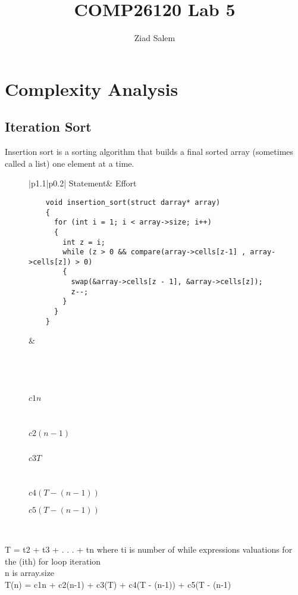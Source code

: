 \documentclass{article}
\title{COMP26120 Lab 5}
\author{Ziad Salem}
\begin{document}
\maketitle


\section{Complexity Analysis}
\label{sec:complexity}


\subsection{Iteration Sort}
Insertion sort is a sorting algorithm that builds a final sorted array (sometimes called a list) one element at a time.
\begin{center}
\begin{figure}[H]
\begin{tabular}{|p{}|p{}|}
\hline
Statement& Effort\\
\hline
    \begin{center}
    \begin{verbatim}
    void insertion_sort(struct darray* array)
    {
      for (int i = 1; i < array->size; i++)
      {
        int z = i;
        while (z > 0 && compare(array->cells[z-1] , array->cells[z]) > 0)
        {
          swap(&array->cells[z - 1], &array->cells[z]);
          z--;
        }
      }
    }
    \end{verbatim}
    \end{center}&

    $ $
    $ $

    $ $
    $ $
    $ $

    $c1n$

    $ $
    $ $
    $ $
    $ $
    $ $

    $c2(n-1)$

    $ $

    $c3T $

    $ $
    $ $
    $ $

    $c4(T-(n-1))$

    $c5(T-(n-1))$


\\
\hline
\end{tabular}
\end{figure}
\end{center}
T = t2 + t3 + . . .  + tn where ti is number of while expressions valuations for the (ith) for loop iteration \\
n is array.size\\
T(n) = c1n + c2(n-1) + c3(T) + c4(T - (n-1)) + c5(T - (n-1)\\
\end{document}
